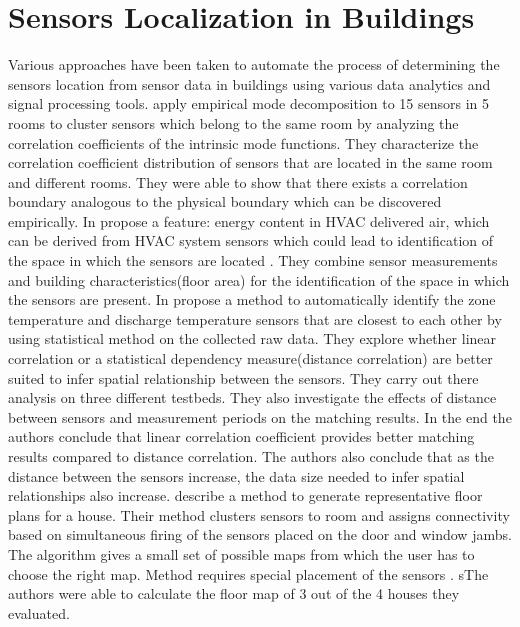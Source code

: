 \section{Sensors Localization in Buildings} 
Various approaches have been taken to automate the process of determining the sensors location from sensor data in buildings using various data analytics and signal processing tools. \citeauthor{Hong:2013:TAS:2528282.2528302}\cite{Hong:2013:TAS:2528282.2528302}
 apply empirical mode decomposition to 15 sensors in 5 rooms to cluster sensors which belong to the same room by analyzing the correlation coefficients of the intrinsic mode functions. They characterize the correlation coefficient distribution of sensors that are located in the
 same room and different rooms. They were able to show that there exists a correlation boundary analogous to the physical boundary which can be discovered empirically. 
In \cite{doi:10.1061/9780784413616.226} \citeauthor{doi:10.1061/9780784413616.226} propose a feature: energy content in HVAC delivered air, which can be derived from HVAC system sensors which could lead to identification of the space in which the sensors are located . They combine sensor measurements and building characteristics(floor area) for the identification of the space in which the sensors are present.
In \cite{Koc:2014:CLC:2674061.2674075} \citeauthor{Koc:2014:CLC:2674061.2674075} propose a method to automatically identify the zone temperature and discharge temperature sensors that are closest to each other by using statistical method on the collected raw data. They explore whether linear correlation or a statistical dependency measure(distance correlation) are better suited to infer spatial relationship between the sensors. They carry out there analysis on three different testbeds. They also investigate the effects of distance between sensors and measurement periods on the matching results. In the end the authors conclude that linear correlation coefficient provides better matching results compared to distance correlation. The authors also conclude that as the distance between the sensors increase, the data size needed to infer spatial relationships also increase.
\citeauthor{Lu:2014:SBS:2648771.2629441}\cite{Lu:2014:SBS:2648771.2629441} describe a method to generate representative floor plans for a house. Their method clusters sensors to room and assigns connectivity based on simultaneous firing of the sensors placed on the door and window jambs. The algorithm gives a small set of possible maps from which the user has to choose the right map. Method requires special placement of the sensors . sThe authors were able to calculate the floor map of 3 out of the 4 houses they evaluated.  
